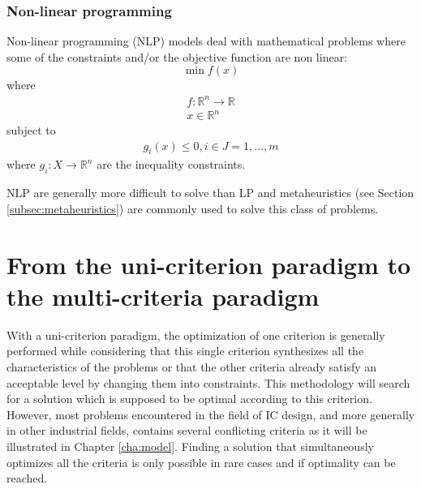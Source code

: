 \subsubsection{Non-linear programming}
Non-linear programming (NLP) models deal with mathematical problems where some of the constraints and/or the objective function are non linear:
\begin{equation}
\min f(x)
\end{equation}
where
\begin{equation*}
\begin{gathered}
f: \mathbb{R}^n \rightarrow \mathbb{R}\\
x \in \mathbb{R}^n
\end{gathered}
\end{equation*}
subject to
\begin{equation*}
\begin{gathered}
g_i(x) \leq 0, i \in J = 1, \dots, m
\end{gathered}
\end{equation*}
where $g_i : X \rightarrow \mathbb{R}^n$ are the inequality constraints.

NLP are generally more difficult to solve than LP \cite{talbi09} and metaheuristics (see Section \ref{subsec:metaheuristics}) are commonly used to solve this class of problems.




\section{From the uni-criterion paradigm to the multi-criteria paradigm}
\label{sec:rol2.unicritmulticrit}

With a uni-criterion paradigm, the optimization of one criterion is generally performed while considering that this single criterion synthesizes all the characteristics of the problems or that the other criteria already satisfy an acceptable level by changing them into constraints. This methodology will search for a solution which is supposed to be optimal according to this criterion. However, most problems encountered in the field of IC design, and more generally in other industrial fields, contains several conflicting criteria as it will be illustrated in Chapter \ref{cha:model}. Finding a solution that simultaneously optimizes all the criteria is only possible in rare cases and if optimality can be reached.

